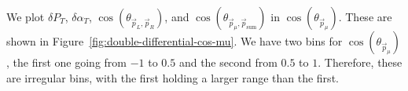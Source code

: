 \documentclass{article}
\newcommand{\vm}{\vec{p}_\mu}
\newcommand{\vlp}{\vec{p}_L}
\newcommand{\vrp}{\vec{p}_R}
\newcommand{\vtp}{\vec{p}_{\text{sum}}}
\begin{document}
We plot $\delta P_T$, $\delta \alpha_T$, $\cos\left(\theta_{\vlp,\vrp}\right)$, and $\cos\left(\theta_{\vm,\vtp}\right)$ in $\cos(\theta_{\vec{p}_{\mu}})$. These are shown in Figure~\ref{fig:double-differential-cos-mu}. We have two bins for $\cos(\theta_{\vec{p}_{\mu}})$, the first one going from $-1$ to $0.5$ and the second from $0.5$ to $1$. Therefore, these are irregular bins, with the first holding a larger range than the first.

\begin{figure}[H]
    \centering
     \\

\end{figure}
\end{document}
